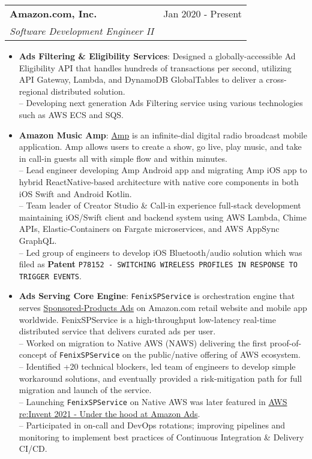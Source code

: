 \documentclass[letterpaper,11pt]{article}
\makeatletter
\newcommand{\resumeItem}[2]{
  \item\small{
    \textbf{#1}{: #2 \vspace{-2pt}}
  }
}
\newcommand{\resumeSubheading}[4]{
  \vspace{-1pt}\item
    \begin{tabular*}{0.97\textwidth}[t]{l@{\extracolsep{\fill}}r}
      \textbf{#1} & #2 \\
      \textit{\small #3} & \textit{\small #4} \\
    \end{tabular*}\vspace{-5pt}
}
\newcommand{\resumeItemListStart}{\begin{itemize}}
\newcommand{\resumeItemListEnd}{\end{itemize}\vspace{-5pt}}
\makeatother
\begin{document}
    \resumeSubheading
      {Amazon.com, Inc.}{Jan 2020 - Present}
      {Software Development Engineer II}{}
      \resumeItemListStart
		\resumeItem{Ads Filtering \& Eligibility Services}
          {Designed a globally-accessible Ad Eligibility API that handles hundreds of transactions per second, utilizing API Gateway, Lambda, and DynamoDB GlobalTables to deliver a cross-regional distributed solution. \\
          -- Developing next generation Ads Filtering service using various technologies such as AWS ECS and SQS.}
		\resumeItem{Amazon Music Amp}
          {\href{https://techcrunch.com/2022/03/08/amazon-launches-a-live-radio-app-amp-which-lets-you-play-dj-with-the-amazon-music-catalog/}{Amp} is an infinite-dial digital radio broadcast mobile application. Amp allows users to create a show, go live, play music, and take in call-in guests all with simple flow and within minutes.\\
          -- Lead engineer developing Amp Android app and migrating Amp iOS app to hybrid ReactNative-based architecture with native core components in both iOS Swift and Android Kotlin.\\
          -- Team leader of Creator Studio \& Call-in experience full-stack development maintaining iOS/Swift client and backend system using AWS Lambda, Chime APIs, Elastic-Containers on Fargate microservices, and AWS AppSync GraphQL.\\
          -- Led group of engineers to develop iOS Bluetooth/audio solution which was filed as \textbf{Patent} \texttt{P78152 - SWITCHING WIRELESS PROFILES IN RESPONSE TO TRIGGER EVENTS}.}          
		\resumeItem{Ads Serving Core Engine}
          {\texttt{FenixSPService} is orchestration engine that serves \href{https://advertising.amazon.com/solutions/products/sponsored-products}{Sponsored-Products Ads} on Amazon.com retail website and mobile app worldwide. FenixSPService is a high-throughput low-latency real-time distributed service that delivers curated ads per user.\\
          -- Worked on migration to Native AWS (NAWS) delivering the first proof-of-concept of \texttt{FenixSPService} on the public/native offering of AWS ecosystem.\\
          -- Identified +20 technical blockers, led team of engineers to develop simple workaround solutions, and eventually provided a risk-mitigation path for full migration and launch of the service.\\
          -- Launching \texttt{FenixSPService} on Native AWS was later featured in \href{https://youtu.be/BS4MPpEO66I?t=1067}{AWS re:Invent 2021 - Under the hood at Amazon Ads}.\\
          -- Participated in on-call and DevOps rotations; improving pipelines and monitoring to implement best practices of Continuous Integration \& Delivery CI/CD.}
	\resumeItemListEnd
\end{document}
